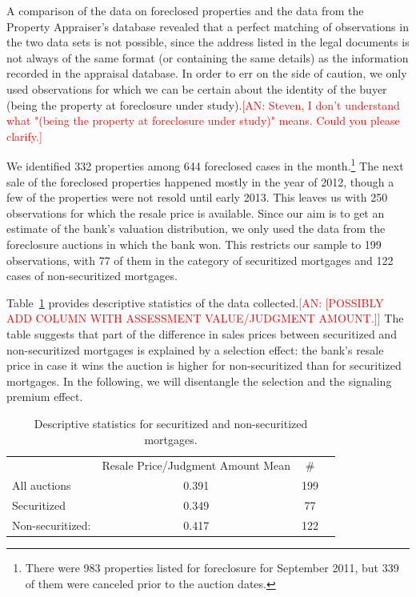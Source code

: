 \documentclass[11pt,twopage]{article}
\newcommand{\AN}[1]{\textcolor{red}{[AN: #1]}}
\begin{document}
A comparison of the data on foreclosed properties and the data from the Property Appraiser's database revealed that a perfect matching of observations in the two data sets is not possible, since the address listed in the legal documents is not always of the same format (or containing the same details) as the information recorded in the appraisal database. In order to err on the side of caution, we only used observations for which we can be certain about the identity of the buyer (being the property at foreclosure under study).\AN{Steven, I don't understand what "(being the property at foreclosure under study)" means. Could you please clarify.} 

We identified 332 properties among 644 foreclosed cases in the month.\footnote{There were 983 properties listed for foreclosure for September 2011, but 339 of them were canceled prior to the auction dates.} The next sale of the foreclosed properties happened mostly in the year of 2012, though a few of the properties were not resold until early 2013. This leaves us with 250 observations for which the resale price is available. Since our aim is to get an estimate of the bank's valuation distribution, we only used the data from the foreclosure auctions in which the bank won. This restricts our sample to 199 observations, with 77 of them in the category of securitized mortgages and 122 cases of non-securitized mortgages. 

Table~\ref{tab:descriptive-securitization-resale} provides descriptive
statistics of the data collected.\AN{[POSSIBLY ADD COLUMN WITH ASSESSMENT
VALUE/JUDGMENT AMOUNT.]} The table suggests that part of the difference
in sales prices between securitized and non-securitized mortgages is
explained by a selection effect: the bank's resale price in case it
wins the auction is higher for non-securitized than for securitized
mortgages. In the following, we will disentangle the selection and the
signaling premium effect.

\begin{table}[!htbp]
	\centering \caption{Descriptive statistics for securitized and
		non-securitized mortgages. %
		\label{tab:descriptive-securitization-resale}}
	\begin{tabular}{lccc}
		\hline\hline
		& Resale Price/Judgment Amount Mean %
		& \#\\
		All auctions & 0.391 %
		& 199 \\
		Securitized & 0.349 %
		& 77 \\
		Non-securitized: & 0.417 %
		& 122 \\
		\hline
	\end{tabular}
\end{table}
\end{document}
